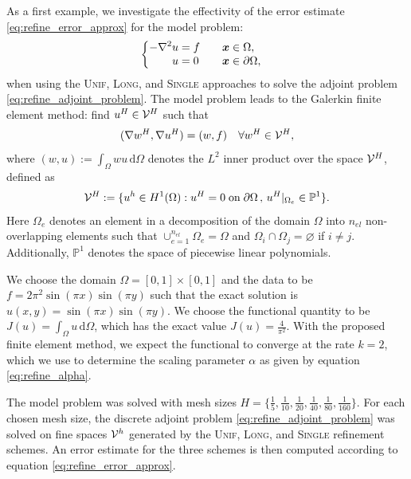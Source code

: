 As a first example, we investigate the effectivity of the error estimate
\eqref{eq:refine_error_approx} for the model problem:
%
\begin{gather}
\begin{cases}
\begin{aligned}
- \nabla^2 u &= f \quad &&\boldsymbol{x} \in \Omega, \\
u &= 0  \quad &&\boldsymbol{x} \in \partial \Omega,
\end{aligned}
\end{cases}
\end{gather}
%
when using the \textsc{Unif}, \textsc{Long}, and \textsc{Single} approaches
to solve the adjoint problem \eqref{eq:refine_adjoint_problem}.
The model problem leads to the Galerkin finite element method: find
$u^H \in \mathcal{V}^H$ such that
%
\begin{gather}
(\nabla w^H, \nabla u^H) = (w, f) \quad \forall w^H \in \mathcal{V}^H,
\label{eq:refine_poisson_fem}
\end{gather}
%
where $(w,u) := \int_{\Omega} w u \, \text{d} \Omega$ denotes the $L^2$ inner
product over the space $\mathcal{V}^H$, defined as
%
\begin{gather}
\mathcal{V}^H := \{ u^h \in H^1(\Omega) :
u^H = 0 \; \text{on} \; \partial \Omega \, , \,
u^H |_{\Omega_e} \in \mathbb{P}^1 \}.
\label{eq:refine_poisson_space}
\end{gather}
%
Here $\Omega_e$ denotes an element in a decomposition of the domain
$\Omega$ into $n_{el}$ non-overlapping elements such that
$\cup_{e=1}^{n_{el}} \Omega_e = \Omega$ and
$\Omega_i \cap \Omega_j = \varnothing$ if $i \neq j$.
Additionally,  $\mathbb{P}^1$ denotes the space of piecewise linear
polynomials.

We choose the domain $\Omega = [0,1] \times [0,1]$ and the data
to be $f = 2 \pi^2 \sin(\pi x) \sin(\pi y)$ such that the
exact solution is $u(x,y) = \sin(\pi x) \sin(\pi y)$.
We choose the functional quantity to be
$J(u) = \int_{\Omega} u \, \text{d} \Omega$, which has the exact
value $J(u) = \frac{4}{\pi^2}$.
With the proposed finite element method, we
expect the functional to converge at the rate
$k=2$, which we use to determine the scaling parameter
$\alpha$ as given by equation \eqref{eq:refine_alpha}.

The model problem was solved with mesh sizes
$H = \{\frac{1}{5}, \frac{1}{10}, \frac{1}{20},
\frac{1}{40}, \frac{1}{80}, \frac{1}{160} \}$.
For each chosen mesh size, the discrete
adjoint problem \eqref{eq:refine_adjoint_problem}
was solved on fine spaces $\mathcal{V}^h$
generated by the \textsc{Unif},
\textsc{Long}, and \textsc{Single} refinement
schemes. An error estimate for the three schemes
is then computed according to equation
\eqref{eq:refine_error_approx}.

